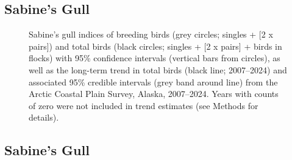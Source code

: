 \documentclass[
]{article}
\begin{document}
\newpage{}

\subsection*{Sabine's Gull}\label{sabines-gull}

\begin{figure}


\caption{\label{fig-SAGU}Sabine's gull indices of breeding birds (grey
circles; singles + {[}2 x pairs{]}) and total birds (black circles;
singles + {[}2 x pairs{]} + birds in flocks) with 95\% confidence
intervals (vertical bars from circles), as well as the long-term trend
in total birds (black line; 2007--2024) and associated 95\% credible
intervals (grey band around line) from the Arctic Coastal Plain Survey,
Alaska, 2007--2024. Years with counts of zero were not included in trend
estimates (see Methods for details).}

\end{figure}%

\newpage{}

\subsection*{Sabine's Gull}\label{sabines-gull-1}

\begingroup\fontsize{10}{12}\selectfont
\end{document}
